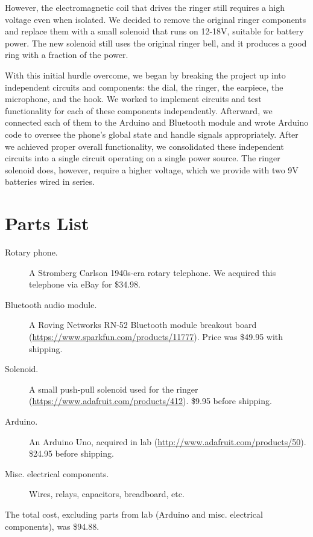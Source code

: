 \documentclass{es50report}
\begin{document}
        However, the electromagnetic coil that drives the ringer still requires a high voltage even when isolated. We decided to remove the original ringer components and replace them with a small solenoid that runs on 12-18V, suitable for battery power. The new solenoid still uses the original ringer bell, and it produces a good ring with a fraction of the power.

        With this initial hurdle overcome, we began by breaking the project up into independent circuits and components: the dial, the ringer, the earpiece, the microphone, and the hook. We worked to implement circuits and test functionality for each of these components independently. Afterward, we connected each of them to the Arduino and Bluetooth module and wrote Arduino code to oversee the phone's global state and handle signals appropriately. After we achieved proper overall functionality, we consolidated these independent circuits into a single circuit operating on a single power source. The ringer solenoid does, however, require a higher voltage, which we provide with two 9V batteries wired in series.

    \section{Parts List}
        \begin{description}
            \item[Rotary phone.] A Stromberg Carlson 1940s-era rotary telephone. We acquired this telephone via eBay for \$34.98.
            \item[Bluetooth audio module.] A Roving Networks RN-52 Bluetooth module breakout board (\url{https://www.sparkfun.com/products/11777}). Price was \$49.95 with shipping.
            \item[Solenoid.] A small push-pull solenoid used for the ringer (\url{https://www.adafruit.com/products/412}). \$9.95 before shipping.
            \item[Arduino.] An Arduino Uno, acquired in lab (\url{http://www.adafruit.com/products/50}). \$24.95 before shipping.
            \item[Misc. electrical components.] Wires, relays, capacitors, breadboard, etc.
        \end{description}

        The total cost, excluding parts from lab (Arduino and misc. electrical components), was \$94.88.
\end{document}
